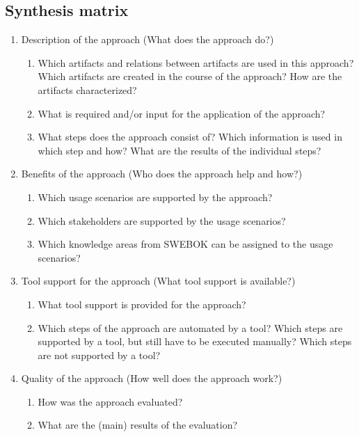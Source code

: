 \newpage

\subsection{Synthesis matrix}

\begin{enumerate}
	\item Description of the approach (What does the approach do?)
	\begin{enumerate}
		\item Which artifacts and relations between artifacts are used in this approach? Which artifacts are created in the course of the approach? How are the artifacts characterized?
		\item What is required and/or input for the application of the approach?
		\item What steps does the approach consist of? Which information is used in which step and how? What are the results of the individual steps?
	\end{enumerate}
	\item Benefits of the approach (Who does the approach help and how?)
	\begin{enumerate}
		\item Which usage scenarios are supported by the approach?
		\item Which stakeholders are supported by the usage scenarios?
		\item Which knowledge areas from SWEBOK can be assigned to the usage scenarios?
	\end{enumerate}
	\item Tool support for the approach (What tool support is available?)
	\begin{enumerate}
		\item What tool support is provided for the approach?
		\item Which steps of the approach are automated by a tool? Which steps are supported by a tool, but still have to be executed manually? Which steps are not supported by a tool?
	\end{enumerate}
	\item Quality of the approach (How well does the approach work?)
	\begin{enumerate}
		\item How was the approach evaluated?
		\item What are the (main) results of the evaluation?
	\end{enumerate}
\end{enumerate}

